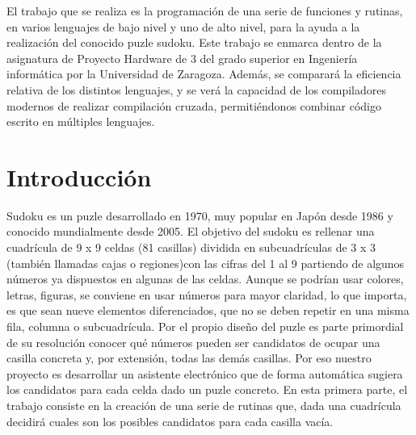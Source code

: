 \documentclass[12pt,letterpaper]{article}
\begin{document}
El trabajo que se realiza es la programaci\'on de una serie de
funciones y rutinas, en varios lenguajes de bajo nivel y uno de alto
nivel, para la ayuda a la realizaci\'on del conocido puzle
sudoku. Este trabajo se enmarca dentro de la asignatura de Proyecto
Hardware de 3 del grado superior en Ingenier\'ia inform\'atica por la
Universidad de Zaragoza. Adem\'as, se comparar\'a la eficiencia relativa
de los distintos lenguajes, y se ver\'a la capacidad de los
compiladores modernos de realizar compilaci\'on cruzada,
permiti\'endonos combinar c\'odigo escrito en m\'ultiples lenguajes.

\section{Introducci\'on}
Sudoku es un puzle desarrollado en 1970, muy popular en Jap\'on desde
1986 y conocido mundialmente desde 2005.  El objetivo del sudoku es
rellenar una cuadr\'icula de 9 x 9 celdas (81 casillas) dividida en
subcuadr\'iculas de 3 x 3 (tambi\'en llamadas cajas o regiones)con las
cifras del 1 al 9 partiendo de algunos n\'umeros ya dispuestos en
algunas de las celdas. Aunque se podr\'ian usar colores, letras,
figuras, se conviene en usar n\'umeros para mayor claridad, lo que
importa, es que sean nueve elementos diferenciados, que no se deben
repetir en una misma fila, columna o subcuadr\'icula.  Por el propio
diseño del puzle es parte primordial de su resoluci\'on conocer qu\'e
n\'umeros pueden ser candidatos de ocupar una casilla concreta y, por
extensi\'on, todas las dem\'as casillas.  Por eso nuestro proyecto es
desarrollar un asistente electr\'onico que de forma autom\'atica sugiera
los candidatos para cada celda dado un puzle concreto.  En esta
primera parte, el trabajo consiste en la creaci\'on de una serie de
rutinas que, dada una cuadr\'icula decidir\'a cuales son los posibles
candidatos para cada casilla vac\'ia.
\end{document}
